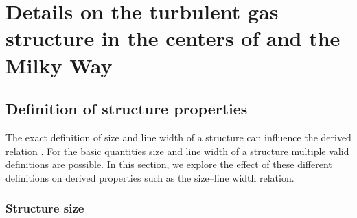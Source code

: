 
\chapter{Details on the turbulent gas structure in the centers of  and the Milky Way}
\label{appendix: dendro}



\section{Definition of structure properties}
\label{appendix: dendro: structure definition}

The exact definition of size and line width of a structure can influence the derived relation \citep[e.g.][]{2002ApJ...570..734B,2010ApJ...712.1049S}. For the basic quantities size and line width of a structure multiple valid definitions are possible. In this section, we explore the effect of these different definitions on derived properties such as the size--line width relation.


\subsection{Structure size}
\label{appendix: dendro: size definition}

